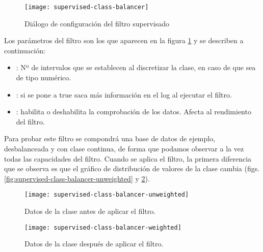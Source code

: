 \begin{figure}[ht]
    \centering
    \texttt{[image: supervised-class-balancer]}
    \caption{Diálogo de configuración del filtro supervisado }
    \label{fig:supervised-class-balancer}
\end{figure}

Los parámetros del filtro son los que aparecen en la figura \ref{fig:supervised-class-balancer} y se describen a continuación:
\begin{itemize}
    \item {}: Nº de intervalos que se establecen al discretizar la clase, en caso de que sea de tipo numérico.
    \item {}: si se pone a true saca más información en el log al ejecutar el filtro.
    \item {}: habilita o deshabilita la comprobación de los datos. Afecta al rendimiento del filtro.
\end{itemize}

Para probar este filtro se compondrá una base de datos de ejemplo, desbalanceada y con clase continua, de forma que podamos observar a la vez todas las capacidades del filtro. Cuando se aplica el filtro, la primera diferencia que se observa es que el gráfico de distribución de valores de la clase cambia (figs. \ref{fig:supervised-class-balancer-unweighted} y \ref{fig:supervised-class-balancer-weighted}).

\begin{figure}[H]
    \centering
    \begin{minipage}{0.50\textwidth}
        \centering
        \texttt{[image: supervised-class-balancer-unweighted]}
        \caption{Datos de la clase antes de aplicar el filtro.}
        \label{fig:supervised-class-balancer-unweighted}
    \end{minipage}\hfill
    \begin{minipage}{0.50\textwidth}
        \centering
        \texttt{[image: supervised-class-balancer-weighted]}
        \caption{Datos de la clase después de aplicar el filtro.}
        \label{fig:supervised-class-balancer-weighted}
    \end{minipage}
\end{figure}


